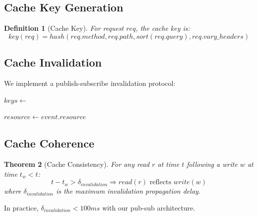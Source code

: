 \documentclass[11pt,a4paper]{article}
\newtheorem{theorem}{Theorem}[section]
\newtheorem{definition}[theorem]{Definition}
\begin{document}
\subsection{Cache Key Generation}

\begin{definition}[Cache Key]
For request $req$, the cache key is:
\begin{equation}
key(req) = hash(req.method, req.path, sort(req.query), req.vary\_headers)
\end{equation}
\end{definition}

\subsection{Cache Invalidation}

We implement a publish-subscribe invalidation protocol:

\begin{algorithm}
\caption{Cache Invalidation}
\begin{algorithmic}[1]
    \State $keys \gets$ 
        \State {}
    \EndFor
    \State {}
\EndFunction

    \State $resource \gets event.resource$
    \State {}
        \State {}
    \EndFor
\EndFunction
\end{algorithmic}
\end{algorithm}

\subsection{Cache Coherence}

\begin{theorem}[Cache Consistency]
For any read $r$ at time $t$ following a write $w$ at time $t_w < t$:
\begin{equation}
t - t_w > \delta_{invalidation} \Rightarrow read(r) \text{ reflects } write(w)
\end{equation}
where $\delta_{invalidation}$ is the maximum invalidation propagation delay.
\end{theorem}

In practice, $\delta_{invalidation} < 100ms$ with our pub-sub architecture.
\end{document}
